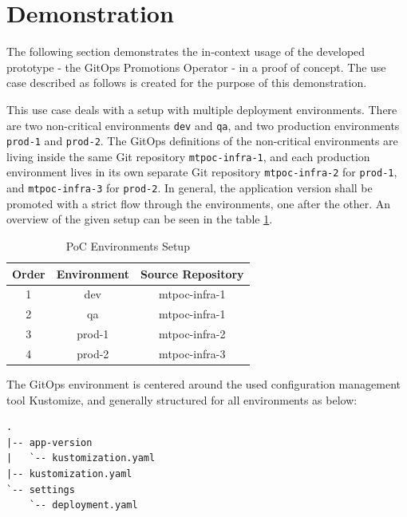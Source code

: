 \section{Demonstration}
\label{prototype:demonstration}

The following section demonstrates the in-context usage of the
developed prototype - the GitOps Promotions Operator - in a proof of concept.
The use case described as follows is created for the purpose of this demonstration.

This use case deals with a setup with multiple deployment environments.
There are two non-critical environments \lstinline|dev| and \lstinline|qa|,
and two production environments \lstinline|prod-1| and \lstinline|prod-2|.
The GitOps definitions of the non-critical environments are living inside the same
Git repository \lstinline|mtpoc-infra-1|,
and each production environment lives in its own separate Git repository
\lstinline|mtpoc-infra-2| for \lstinline|prod-1|,
and \lstinline|mtpoc-infra-3| for \lstinline|prod-2|.
In general, the application version shall be promoted with a strict flow
through the environments, one after the other.
An overview of the given setup can be seen in the table \ref{table:poc-environments-setup}.

\begin{table}[h]
\begin{center}
	\begin{tabular}{||c c c||} 
		\hline
		Order & Environment & Source Repository \\ [0.5ex] 
		\hline\hline
		1 & dev & mtpoc-infra-1 \\ 
		\hline
		2 & qa & mtpoc-infra-1 \\
		\hline
		3 & prod-1 & mtpoc-infra-2 \\
		\hline
		4 & prod-2 & mtpoc-infra-3 \\
		\hline
	\end{tabular}
	\caption{PoC Environments Setup}
	\label{table:poc-environments-setup}
\end{center}
\end{table}

The GitOps environment is centered around the used configuration management tool
Kustomize, and generally structured for all environments as below:

\begin{lstlisting}
.
|-- app-version
|   `-- kustomization.yaml
|-- kustomization.yaml
`-- settings
    `-- deployment.yaml
\end{lstlisting}

